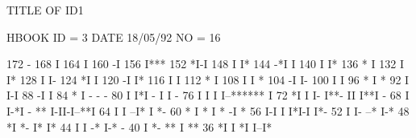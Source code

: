 \begin{Listing}
 TITLE OF ID1                                                                    
 
 HBOOK     ID =         3                                        DATE  18/05/92              NO =    16
 
      172                                    -
      168                                    I
      164                                    I
      160                                   -I
      156                                   I***
      152                                   *I-I
      148                                   I  I*
      144                                 -*I   I
      140                                 I     I*
      136                                 *      I
      132                                 I      I*
      128                                 I      I-
      124                                *I       I
      120                               -I        I*
      116                               I         I
      112                               *         I
      108                               I         I *
      104                              -I         I-
      100                              I           I
       96                              *           I *
       92                              I           I-I
       88                             -I             I
       84                             *              I -                              - -
       80                             I              I*I                        -     I I  -
       76                             I              I I                        I--******  I
       72                            *I              I I-                       I**- II I**I -
       68                             I              I-*I                    - **  I-II-I--**I
       64                             I                 I                  --I* I            *-
       60                           * I                 *                  I * -I             *
       56                           I-I                 I                  I*I-I              I*-
       52                           I                   I-               --*                  I-*
       48                          *I                    *-              I*                     I*
       44                          I                      I             -*                      I-* -
       40                          I                      *-           **                        I **
       36                         *I                       I          *I                         I--I*

\end{Listing}
